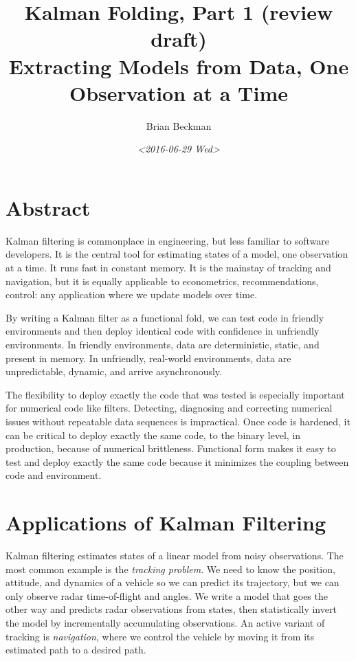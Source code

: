 \documentclass[10pt,oneside,x11names]{article}
\author{Brian Beckman}
\date{\textit{<2016-06-29 Wed>}}
\title{Kalman Folding, Part 1 (review draft)\\\medskip
\large Extracting Models from Data, One Observation at a Time}
\begin{document}
\maketitle
\setcounter{tocdepth}{3}
\tableofcontents


\section{Abstract}
\label{sec:orgheadline1}

Kalman filtering is commonplace in engineering, but less familiar to software
developers. It is the central tool for estimating states of a model, one
observation at a time. It runs fast in constant memory. It is the mainstay of
tracking and navigation, but it is equally applicable to econometrics,
recommendations, control: any application where we update models over time.

By writing a Kalman filter as a functional fold, we can test code in friendly
environments and then deploy identical code with confidence in unfriendly
environments. In friendly environments, data are deterministic, static, and
present in memory. In unfriendly, real-world environments,
data are unpredictable, dynamic, and arrive asynchronously.

The flexibility to deploy exactly the code that was tested is especially
important for numerical code like filters. Detecting, diagnosing and correcting
numerical issues without repeatable data sequences is impractical. Once code is
hardened, it can be critical to deploy exactly the same code, to the binary
level, in production, because of numerical brittleness. Functional form makes it
easy to test and deploy exactly the same code because it minimizes the coupling
between code and environment.

\section{Applications of Kalman Filtering}
\label{sec:orgheadline2}

Kalman filtering estimates states of a linear model from noisy observations. The
most common example is the \emph{tracking problem}. We need to know the position,
attitude, and dynamics of a vehicle so we can predict its trajectory, but we can
only observe radar time-of-flight and angles. We write a model that goes the
other way and predicts radar observations from states, then statistically invert
the model by incrementally accumulating observations. An active variant of
tracking is \emph{navigation}, where we control the vehicle by moving it from its
estimated path to a desired path.
\end{document}
